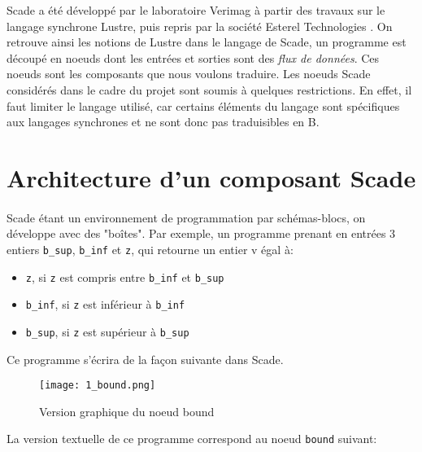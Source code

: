 


Scade a été développé par le laboratoire Verimag à partir des travaux sur
le langage synchrone Lustre, puis repris par la société Esterel Technologies \cite{Estech}. On retrouve
ainsi les notions de Lustre dans le langage de Scade, un programme est découpé
en noeuds dont les entrées et sorties sont des \emph{flux de données}. Ces
noeuds sont les composants que nous voulons traduire. 
Les noeuds Scade considérés dans le cadre du projet \cercles  sont
soumis à quelques restrictions. En effet, il faut limiter le langage
utilisé, car certains éléments du langage sont spécifiques aux
langages synchrones et ne sont donc pas traduisibles en B.\\


\section{Architecture d'un composant Scade}

\paragraph{}
Scade étant un environnement de programmation par schémas-blocs, on
développe avec des "boîtes". Par exemple, un programme prenant en
entrées 3 entiers \texttt{b\_sup}, \texttt{b\_inf} et \texttt{z}, qui retourne un entier v égal
à:
\begin{itemize}
\item \texttt{z}, si \texttt{z} est compris entre \texttt{b\_inf} et \texttt{b\_sup}
\item \texttt{b\_inf}, si \texttt{z} est inférieur à \texttt{b\_inf}
\item \texttt{b\_sup}, si \texttt{z} est supérieur à \texttt{b\_sup}
\end{itemize}
Ce programme s'écrira de la façon suivante dans Scade. 

\begin{figure}[h]
\begin{center}
\texttt{[image: 1\_bound.png]}
\end{center}
\caption{Version graphique du noeud bound}
\end{figure}

La version textuelle de ce programme correspond au noeud \texttt{bound} suivant:


